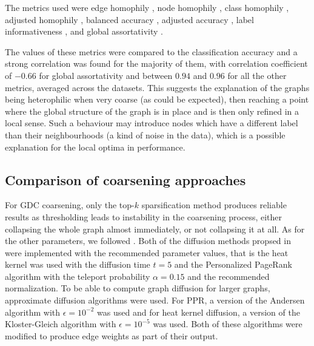 The metrics used were edge homophily \cite{zhu_beyond_2020}, node homophily \cite{pei_geom-gcn_2020}, class homophily \cite{lim_large_2021}, adjusted homophily \cite{platonov_characterizing_2022}, balanced accuracy \cite{platonov_characterizing_2022}, adjusted accuracy \cite{platonov_characterizing_2022}, label informativeness \cite{platonov_characterizing_2022}, and global assortativity \cite{newman_mixing_2003}.

The values of these metrics were compared to the classification accuracy and a strong correlation was found for the majority of them, with correlation coefficient of \( -0.66 \) for global assortativity and between \( 0.94 \) and \( 0.96 \) for all the other metrics, averaged across the datasets. This suggests the explanation of the graphs being heterophilic when very coarse (as could be expected), then reaching a point where the global structure of the graph is in place and is then only refined in a local sense. Such a behaviour may introduce nodes which have a different label than their neighbourhoods (a kind of noise in the data), which is a possible explanation for the local optima in performance.

\subsection{Comparison of coarsening approaches}

For GDC coarsening, only the top-\( k \) sparsification method produces reliable results as thresholding leads to instability in the coarsening process, either collapsing the whole graph almost immediately, or not collapsing it at all. As for the other parameters, we followed \cite{gasteiger_diffusion_2019}. Both of the diffusion methods propsed in \cite{gasteiger_diffusion_2019} were implemented with the recommended parameter values, that is the heat kernel was used with the diffusion time \( t = 5 \) and the Personalized PageRank algorithm with the teleport probability \( \alpha = 0.15 \) and the recommended normalization. To be able to compute graph diffusion for larger graphs, approximate diffusion algorithms were used. For PPR, a version of the Andersen algorithm \cite{andersen_local_2006} with \( \epsilon = 10^{-2} \) was used and for heat kernel diffusion, a version of the Kloster-Gleich algorithm \cite{kloster_heat_2014} with \( \epsilon = 10^{-5} \) was used. Both of these algorithms were modified to produce edge weights as part of their output.


